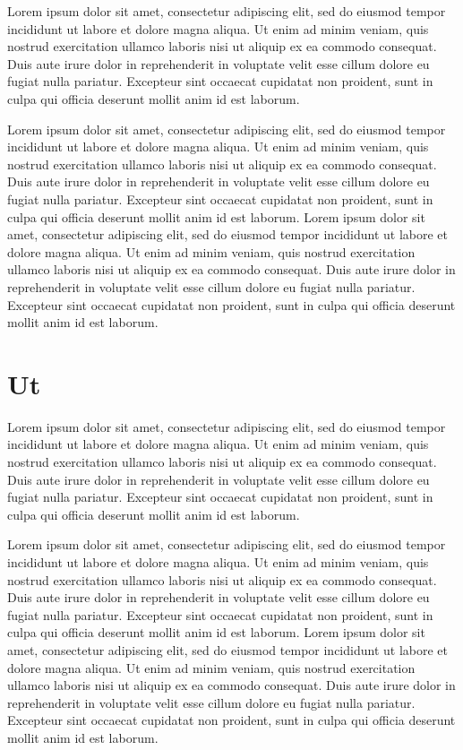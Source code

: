   Lorem ipsum dolor sit amet, consectetur adipiscing elit, sed do eiusmod tempor
  incididunt ut labore et dolore magna aliqua. Ut enim ad minim veniam, quis
  nostrud exercitation ullamco laboris nisi ut aliquip ex ea commodo consequat.
  Duis aute irure dolor in reprehenderit in voluptate velit esse cillum dolore eu
  fugiat nulla pariatur. Excepteur sint occaecat cupidatat non proident, sunt in
  culpa qui officia deserunt mollit anim id est laborum.

  Lorem ipsum dolor sit amet, consectetur adipiscing elit, sed do eiusmod tempor
  incididunt ut labore et dolore magna aliqua. Ut enim ad minim veniam, quis
  nostrud exercitation ullamco laboris nisi ut aliquip ex ea commodo consequat.
  Duis aute irure dolor in reprehenderit in voluptate velit esse cillum dolore eu
  fugiat nulla pariatur. Excepteur sint occaecat cupidatat non proident, sunt in
  culpa qui officia deserunt mollit anim id est laborum.
  Lorem ipsum dolor sit amet, consectetur adipiscing elit, sed do eiusmod tempor
  incididunt ut labore et dolore magna aliqua. Ut enim ad minim veniam, quis
  nostrud exercitation ullamco laboris nisi ut aliquip ex ea commodo consequat.
  Duis aute irure dolor in reprehenderit in voluptate velit esse cillum dolore eu
  fugiat nulla pariatur. Excepteur sint occaecat cupidatat non proident, sunt in
  culpa qui officia deserunt mollit anim id est laborum.

\section{Ut}
  Lorem ipsum dolor sit amet, consectetur adipiscing elit, sed do eiusmod tempor
  incididunt ut labore et dolore magna aliqua. Ut enim ad minim veniam, quis
  nostrud exercitation ullamco laboris nisi ut aliquip ex ea commodo consequat.
  Duis aute irure dolor in reprehenderit in voluptate velit esse cillum dolore eu
  fugiat nulla pariatur. Excepteur sint occaecat cupidatat non proident, sunt in
  culpa qui officia deserunt mollit anim id est laborum.

  Lorem ipsum dolor sit amet, consectetur adipiscing elit, sed do eiusmod tempor
  incididunt ut labore et dolore magna aliqua. Ut enim ad minim veniam, quis
  nostrud exercitation ullamco laboris nisi ut aliquip ex ea commodo consequat.
  Duis aute irure dolor in reprehenderit in voluptate velit esse cillum dolore eu
  fugiat nulla pariatur. Excepteur sint occaecat cupidatat non proident, sunt in
  culpa qui officia deserunt mollit anim id est laborum.
  Lorem ipsum dolor sit amet, consectetur adipiscing elit, sed do eiusmod tempor
  incididunt ut labore et dolore magna aliqua. Ut enim ad minim veniam, quis
  nostrud exercitation ullamco laboris nisi ut aliquip ex ea commodo consequat.
  Duis aute irure dolor in reprehenderit in voluptate velit esse cillum dolore eu
  fugiat nulla pariatur. Excepteur sint occaecat cupidatat non proident, sunt in
  culpa qui officia deserunt mollit anim id est laborum.
